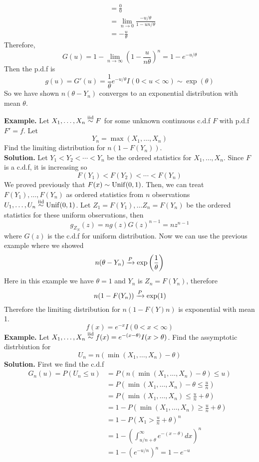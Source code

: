 \documentclass[openany]{report}
\begin{document}
\begin{enumerate}[label=(\roman*)]
\begin{align*}
        &= \frac{0}{0}\tag{Apply L'hoptial's Rule}\\
        &= \lim_{n\rightarrow 0}\frac{-u/\theta}{1 - un/\theta}\\
        &= -\frac{u}{\theta}
    \end{align*}
    Therefore, 
    \[G(u) = 1 -\lim_{n\rightarrow\infty} \left(1 - \frac{u}{n\theta}\right)^n = 1 - e^{-u/\theta}\]
    Then the p.d.f is 
    \[g(u) = G'(u) = \frac{1}{\theta}e^{-u/\theta}I(0 < u < \infty) \sim \exp\left(\theta\right) \]
    So we have shown $n(\theta-Y_n)$ converges to an exponential distribution with mean $\theta$.
\end{enumerate}
\textbf{Example.} Let $X_1, \ldots, X_n \overset{\mathrm{iid}}{\sim} F$ for some unknown continuous c.d.f $F$ with p.d.f $F' = f$. Let 
\[Y_n = \max(X_1,\ldots,X_n)\]
Find the limiting distribution for $n(1 - F(Y_n))$.\\[2ex]
\textbf{Solution.} Let $Y_1 < Y_2 < \cdots < Y_n$ be the ordered statistics for $X_1, \ldots, X_n$. Since $F$ is a c.d.f, it is increasing so 
\[F(Y_1) < F(Y_2) < \cdots < F(Y_n)\]
We proved previously that $F(x) \sim \operatorname{Unif}(0,1)$. Then, we can treat $F(Y_1), \ldots, F(Y_n)$ as ordered statistics from $n$ observations $U_1, \ldots, U_n \overset{\mathrm{iid}}{\sim} \operatorname{Unif}(0,1)$. Let $Z_1 = F(Y_1), \ldots Z_n = F(Y_n)$ be the ordered statistics for these uniform observations, then 
\[g_{Z_N}(z) = ng(z)G(z)^{n-1} = nz^{n-1}\]
where $G(z)$ is the c.d.f for uniform distribution. Now we can use the previous example where we showed
\[n(\theta-Y_n)\xrightarrow{P} \exp\left(\frac{1}{\theta}\right)\]
Here in this example we have $\theta = 1$ and $Y_n$ is $Z_n = F(Y_n)$, therefore 
\[n(1 - F(Y_n)) \xrightarrow{P} \exp(1)\]
Therefore the limiting distribution for $n(1-F(Y)n)$ is exponential with mean 1.
\[f(x) = e^{-x}I(0 < x < \infty)\]
\textbf{Example.} Let $X_1, \ldots, X_n \overset{\mathrm{iid}}{\sim} f(x) = e^{-(x-\theta)}I(x > \theta)$. Find the assymptotic distrbiution for 
\[U_n = n(\min(X_1,\ldots, X_n) - \theta)\]
\textbf{Solution.} First we find the c.d.f 
\begin{align*}
    G_n(u) = P(U_n \leq u) &= P(n(\min(X_1,\ldots, X_n) - \theta) \leq u)\\
    &= P\left(\min(X_1, \ldots, X_n) - \theta \leq \frac{u}{n}\right)\\
    &= P\left(\min(X_1, \ldots, X_n) \leq \frac{u}{n} + \theta\right)\\
    &= 1 - P\left(\min(X_1,\ldots, X_n) \geq \frac{u}{n} + \theta\right)\\
    &= 1 - P\left(X_1 > \frac{u}{n} + \theta\right)^n\\
    &= 1 - \left(\int_{u/n + \theta}^\infty e^{-(x-\theta)}dx\right)^n\\
    &= 1 - \left(e^{-u/n}\right)^n = 1-e^{-u}
\end{align*}
\end{document}
